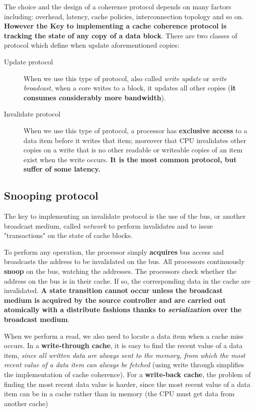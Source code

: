 \documentclass[10pt,a4paper]{article}
\begin{document}
The choice and the design of a coherence protocol depends on many factors including: overhead, latency, cache policies, interconnection topology and so on.
\textbf{However the Key to implementing a cache coherence protocol is tracking the state of any copy of a data block}. There are two classes of protocol which define when update aforementioned copies:
\begin{description}
\item[Update protocol] When we use this type of protocol, also called \textit{write update} or \textit{write broadcast}, when a core writes to a block, it updates all other copies (\textbf{it consumes considerably more bandwidth}).

\item[Invalidate protocol] When we use this type of protocol, a processor has \textbf{exclusive access} to a data item before it writes that item; moreover that CPU invalidates other copies on a write that is no other readable or writeable copies of an item exist when the write occurs. \textbf{It is the most common protocol, but suffer of some latency.}

\end{description}

\subsection{Snooping protocol}

The key to implementing an invalidate protocol is the use of the bus, or another broadcast medium, called \textit{network} to perform invalidates and to issue "transactions" on the state of cache blocks.

To perform any operation, the processor simply \textbf{acquires} bus access and broadcasts the address to be invalidated on the bus. All processors continuously \textbf{snoop} on the bus, watching the addresses. The processors check whether the address on the bus is in their cache. If so, the corresponding data in the cache are invalidated. \textbf{A state transition cannot occur unless the broadcast medium is acquired by the source controller and are carried out atomically with a distribute fashions thanks to \textit{serialization} over the broadcast medium}.

When we perform a read, we also need to locate a data item when a cache miss occurs. In a \textbf{write-through cache}, it is easy to find the recent value of a data item, \textit{since all written data are always sent to the memory, from which the most recent value of a data item can always be fetched} (using write through simplifies the implementation of cache coherence). For a \textbf{write-back cache}, the problem of finding the most recent data value is
harder, since the most recent value of a data item can be in a cache rather than in memory (the CPU must get data from another cache)
\end{document}
